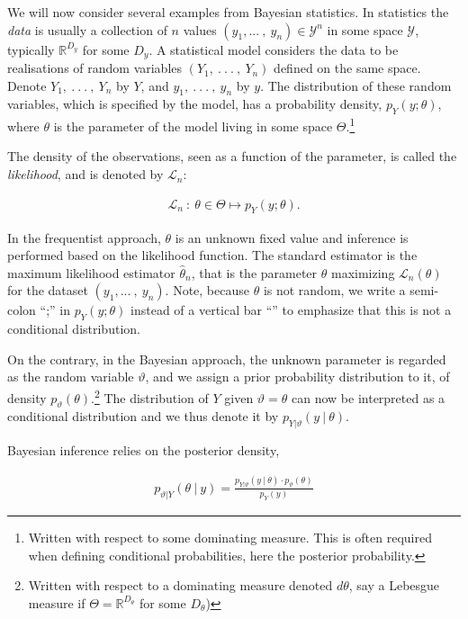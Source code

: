 \documentclass[11pt,a4paper]{article}
\begin{document}
We will now consider several examples from Bayesian statistics. In
statistics the \emph{data} is usually a collection of \(n\) values
\(\left( y_{1},...\ ,\ y_{n} \right) \in \mathcal{Y}^{n}\) in some space
\(\mathcal{Y}\), typically \(\mathbb{R}^{D_{y}}\) for some \(D_{y}\). A
statistical model considers the data to be realisations of random
variables \((Y_{1},\ .\ .\ .\ ,\ Y_{n})\) deﬁned on the same space.
Denote \(Y_{1},\ .\ .\ .\ ,\ Y_{n}\) by \(Y\), and
\(y_{1},\ .\ .\ .\ ,\ y_{n}\) by \(y\). The distribution of these random
variables, which is speciﬁed by the model, has a probability density,
\(p_{Y}(y;\theta)\), where \(\theta\) is the parameter of the model
living in some space \(\Theta\).\footnote{Written with respect to some
  dominating measure. This is often required when defining conditional
  probabilities, here the posterior probability.}

The density of the observations, seen as a function of the parameter, is
called the \emph{likelihood}, and is denoted by \(\mathcal{L}_{n}\):

\begin{align}\mathcal{L}_{n}\ :\ \theta \in \Theta \mapsto p_{Y}(y;\theta).\end{align}

In the frequentist approach, \(\theta\) is an unknown ﬁxed value and
inference is performed based on the likelihood function. The standard
estimator is the maximum likelihood estimator
\({\widehat{\theta}}_{n}\), that is the parameter \(\theta\) maximizing
\(\mathcal{L}_{n}(\theta)\) for the dataset
\(\left( y_{1},...\ ,\ y_{n} \right)\). Note, because \(\theta\) is not
random, we write a semi-colon ``;'' in \(p_{Y}(y;\theta)\) instead of a
vertical bar ``\textbar'' to emphasize that this is not a conditional
distribution.

On the contrary, in the Bayesian approach, the unknown parameter is
regarded as the random variable \(\vartheta\), and we assign a prior
probability distribution to it, of density
\(p_{\vartheta}(\theta)\).\footnote{Written with respect to a dominating
  measure denoted \(d\theta\), say a Lebesgue measure if
  \(\Theta = \mathbb{R}^{D_{\theta}}\) for some \(D_{\theta}\))} The
distribution of \(Y\) given \(\vartheta = \theta\) can now be
interpreted as a conditional distribution and we thus denote it by
\(p_{Y|\vartheta}(y\ |\ \theta)\).

Bayesian inference relies on the posterior density,

\begin{align}p_{\vartheta|Y}(\theta\ |\ y) = \frac{p_{Y|\vartheta}(y\ |\ \theta) \cdot p_{\vartheta}(\theta)}{p_{Y}(y)}\end{align}
\end{document}

